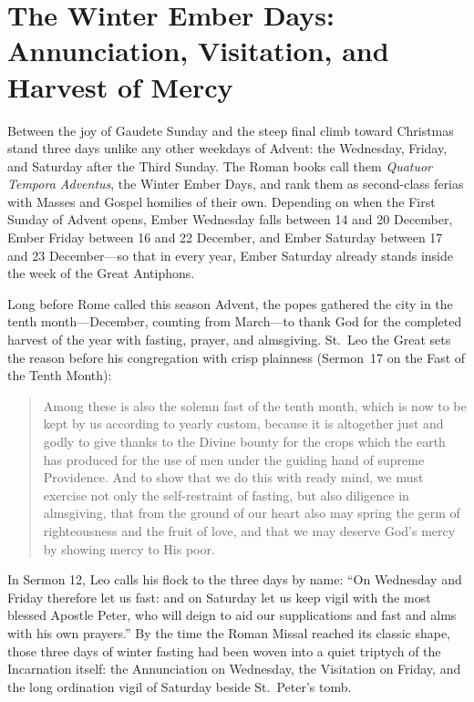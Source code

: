 \section{The Winter Ember Days: Annunciation, Visitation, and Harvest of Mercy}\label{sec:ember-days}

Between the joy of Gaudete Sunday and the steep final climb toward Christmas
stand three days unlike any other weekdays of Advent: the Wednesday, Friday,
and Saturday after the Third Sunday. The Roman books call them \textit{Quatuor
Tempora Adventus}, the Winter Ember Days, and rank them as second-class ferias
with Masses and Gospel homilies of their own. Depending on when the First
Sunday of Advent opens, Ember Wednesday falls between 14 and 20 December, Ember
Friday between 16 and 22 December, and Ember Saturday between 17 and 23
December---so that in every year, Ember Saturday already stands inside the week
of the Great Antiphons.

Long before Rome called this season Advent, the popes gathered the city in the
tenth month---December, counting from March---to thank God for the completed
harvest of the year with fasting, prayer, and almsgiving. St.~Leo the Great
sets the reason before his congregation with crisp plainness (Sermon~17 on the
Fast of the Tenth Month):

\begin{quote}
Among these is also the solemn fast of the tenth month, which is now to be kept
by us according to yearly custom, because it is altogether just and godly to
give thanks to the Divine bounty for the crops which the earth has produced for
the use of men under the guiding hand of supreme Providence. And to show that
we do this with ready mind, we must exercise not only the self-restraint of
fasting, but also diligence in almsgiving, that from the ground of our heart
also may spring the germ of righteousness and the fruit of love, and that we
may deserve God's mercy by showing mercy to His poor.
\end{quote}

In Sermon 12, Leo calls his flock to the three days by name: ``On Wednesday and
Friday therefore let us fast: and on Saturday let us keep vigil with the most
blessed Apostle Peter, who will deign to aid our supplications and fast and
alms with his own prayers.'' By the time the Roman Missal reached its classic
shape, those three days of winter fasting had been woven into a quiet triptych
of the Incarnation itself: the Annunciation on Wednesday, the Visitation on
Friday, and the long ordination vigil of Saturday beside St.~Peter's tomb.

